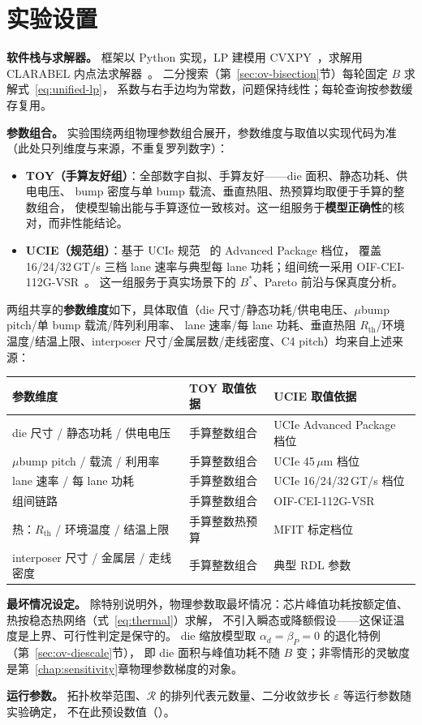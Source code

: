 \section{实验设置}\label{sec:setup}

\textbf{软件栈与求解器。}
框架以 Python 实现，LP 建模用 CVXPY~\cite{diamond2016cvxpy}，求解用 CLARABEL 内点法求解器~\cite{goulart2024clarabel}。
二分搜索（第~\ref{sec:ov-bisection}节）每轮固定 $B$ 求解式~\eqref{eq:unified-lp}，
系数与右手边均为常数，问题保持线性；每轮查询按参数缓存复用。

\textbf{参数组合。}
实验围绕两组物理参数组合展开，参数维度与取值以实现代码为准（此处只列维度与来源，不重复罗列数字）：
\begin{itemize}
    \item \textbf{TOY（手算友好组）}：全部数字自拟、手算友好——die 面积、静态功耗、供电电压、
    bump 密度与单 bump 载流、垂直热阻、热预算均取便于手算的整数组合，
    使模型输出能与手算逐位一致核对。这一组服务于\textbf{模型正确性}的核对，而非性能结论。
    \item \textbf{UCIE（规范组）}：基于 UCIe 规范~\cite{ucie2.0-2024} 的 Advanced Package 档位，
    覆盖 16/24/32\,GT/s 三档 lane 速率与典型每 lane 功耗；组间统一采用 OIF-CEI-112G-VSR~\cite{oif-cei-5.1}。
    这一组服务于真实场景下的 $B^*$、Pareto 前沿与保真度分析。
\end{itemize}

两组共享的\textbf{参数维度}如下，具体取值（die 尺寸/静态功耗/供电电压、$\mu$bump pitch/单 bump 载流/阵列利用率、
lane 速率/每 lane 功耗、垂直热阻 $R_{\text{th}}$/环境温度/结温上限、interposer 尺寸/金属层数/走线密度、C4 pitch）均来自上述来源：

\begin{center}
\begin{tabular}{l|l|l}
\hline
\textbf{参数维度} & \textbf{TOY 取值依据} & \textbf{UCIE 取值依据} \\
\hline
die 尺寸 / 静态功耗 / 供电电压 & 手算整数组合 & UCIe Advanced Package 档位 \\
$\mu$bump pitch / 载流 / 利用率 & 手算整数组合 & UCIe 45\,$\mu$m 档位 \\
lane 速率 / 每 lane 功耗 & 手算整数组合 & UCIe 16/24/32\,GT/s 档位 \\
组间链路 & 手算整数组合 & OIF-CEI-112G-VSR \\
热：$R_{\text{th}}$ / 环境温度 / 结温上限 & 手算整数热预算 & MFIT 标定档位~\cite{mfit2025} \\
interposer 尺寸 / 金属层 / 走线密度 & 手算整数组合 & 典型 RDL 参数 \\
\hline
\end{tabular}
\end{center}

\textbf{最坏情况设定。}
除特别说明外，物理参数取最坏情况：芯片峰值功耗按额定值、热按稳态热网络（式~\eqref{eq:thermal}）求解，
不引入瞬态或降额假设——这保证温度是上界、可行性判定是保守的。
die 缩放模型取 $\alpha_d=\beta_P=0$ 的退化特例（第~\ref{sec:ov-diescale}节），
即 die 面积与峰值功耗不随 $B$ 变；非零情形的灵敏度是第~\ref{chap:sensitivity}章物理参数梯度的对象。

\textbf{运行参数。}
拓扑枚举范围、$\mathcal{R}$ 的排列代表元数量、二分收敛步长 $\varepsilon$ 等运行参数随实验确定，
不在此预设数值（）。

